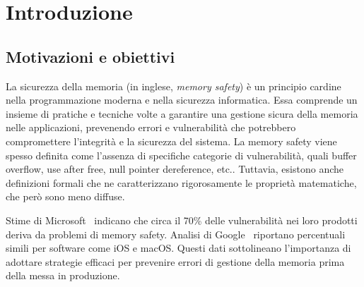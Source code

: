 \chapter{Introduzione}
\label{cha:introduction}

\section*{Motivazioni e obiettivi}
\label{sec:motivation} La sicurezza della memoria (in inglese, \textit{memory
safety}) è un principio cardine nella programmazione moderna e nella sicurezza
informatica. Essa comprende un insieme di pratiche e tecniche volte a garantire una
gestione sicura della memoria nelle applicazioni, prevenendo errori e
vulnerabilità che potrebbero compromettere l'integrità e la sicurezza del
sistema. La memory safety viene spesso definita come l'assenza di specifiche categorie
di vulnerabilità, quali buffer overflow, use after free, null pointer
dereference, etc.. Tuttavia, esistono anche definizioni formali che ne
caratterizzano rigorosamente le proprietà matematiche, che però sono meno diffuse.

Stime di Microsoft~\cite{microsoft_proactive_approach} indicano che circa il 70\%
delle vulnerabilità nei loro prodotti deriva da problemi di memory safety. Analisi
di Google~\cite{google_memory_safety} riportano percentuali simili per software come
iOS e macOS. Questi dati sottolineano l'importanza di adottare strategie
efficaci per prevenire errori di gestione della memoria prima della messa in
produzione.

